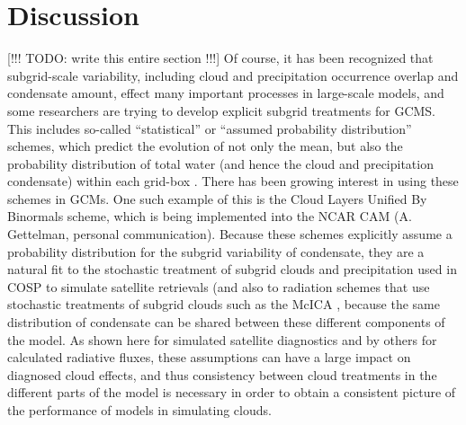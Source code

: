 \section{Discussion}
[!!! TODO: write this entire section !!!]
Of course, it has been recognized that subgrid-scale variability, including cloud and precipitation occurrence overlap and condensate amount, effect many important processes in large-scale models, and some researchers are trying to develop explicit subgrid treatments for GCMS. This includes so-called ``statistical'' or ``assumed probability distribution'' schemes, which predict the evolution of not only the mean, but also the probability distribution of total water (and hence the cloud and precipitation condensate) within each grid-box \citep[e.g.,][]{tompkins_2002}. There has been growing interest in using these schemes in GCMs. One such example of this is the Cloud Layers Unified By Binormals \citep[CLUBB;][]{golaz_et_al_2002} scheme, which is being implemented into the NCAR CAM (A. Gettelman, personal communication). Because these schemes explicitly assume a probability distribution for the subgrid variability of condensate, they are a natural fit to the stochastic treatment of subgrid clouds and precipitation used in COSP to simulate satellite retrievals (and also to radiation schemes that use stochastic treatments of subgrid clouds such as the McICA \citep{pincus_et_al_2003}, because the same distribution of condensate can be shared between these different components of the model. As shown here for simulated satellite diagnostics and by others for calculated radiative fluxes, these assumptions can have a large impact on diagnosed cloud effects, and thus consistency between cloud treatments in the different parts of the model is necessary in order to obtain a consistent picture of the performance of models in simulating clouds.

